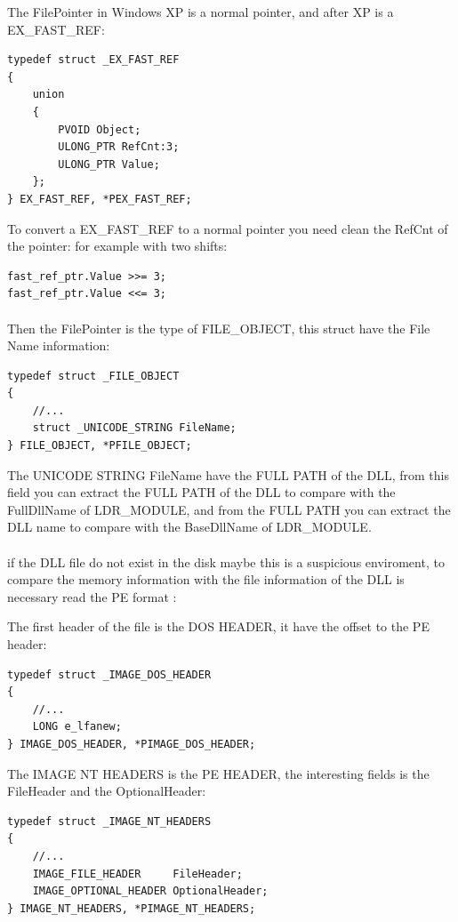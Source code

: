 \documentclass[12pt,a4paper,english]{book}
\newcommand{\ocite}[1]{\footfullcite{#1}}
\newcommand{\paraph}{\paragraph{}}
\begin{document}
The FilePointer in Windows XP is a normal pointer, and after XP is a EX\_FAST\_REF:

\lstset{language=C,caption=EX\_FAST\_REF struct}
\begin{lstlisting}
typedef struct _EX_FAST_REF
{
    union
    {
        PVOID Object;
        ULONG_PTR RefCnt:3;
        ULONG_PTR Value;
    };
} EX_FAST_REF, *PEX_FAST_REF;
\end{lstlisting}

To convert a EX\_FAST\_REF to a normal pointer you need clean the RefCnt of the pointer: for example with two shifts:

\lstset{language=C,caption=cleaning RefCnt of a EX\_FAST\_REF pointer}
\begin{lstlisting}
fast_ref_ptr.Value >>= 3;
fast_ref_ptr.Value <<= 3;
\end{lstlisting}

\paraph{}
Then the FilePointer is the type of FILE\_OBJECT, this struct have the File Name information:

\lstset{language=C,caption=FILE\_OBJECT}
\begin{lstlisting}
typedef struct _FILE_OBJECT
{
    //...
    struct _UNICODE_STRING FileName;
} FILE_OBJECT, *PFILE_OBJECT;
\end{lstlisting}

The UNICODE STRING FileName have the FULL PATH of the DLL, from this field you can extract the FULL PATH of the DLL to compare with the FullDllName of LDR\_MODULE, and from the FULL PATH you can extract the DLL name to compare with the BaseDllName of LDR\_MODULE.

\paraph{}
if the DLL file do not exist in the disk maybe this is a suspicious enviroment, to compare the memory information with the file information of the DLL is necessary read the PE format \ocite{microsoftpecoff2010}:

The first header of the file is the DOS HEADER, it have the offset to the PE header:
\lstset{language=C,caption=IMAGE\_DOS\_HEADER structure}
\begin{lstlisting}
typedef struct _IMAGE_DOS_HEADER
{
    //...
    LONG e_lfanew;
} IMAGE_DOS_HEADER, *PIMAGE_DOS_HEADER;
\end{lstlisting}

The IMAGE NT HEADERS is the PE HEADER, the interesting fields is the FileHeader and the OptionalHeader:
\lstset{language=C,caption=IMAGE\_NT\_HEADERS structure}
\begin{lstlisting}
typedef struct _IMAGE_NT_HEADERS 
{
    //...
    IMAGE_FILE_HEADER     FileHeader;
    IMAGE_OPTIONAL_HEADER OptionalHeader;
} IMAGE_NT_HEADERS, *PIMAGE_NT_HEADERS;
\end{lstlisting}
\end{document}

